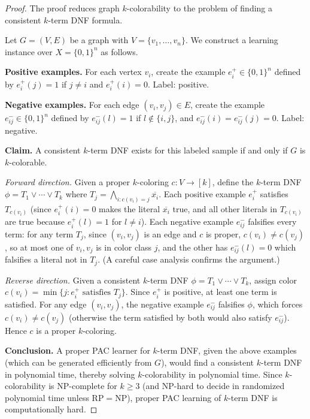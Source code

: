 \begin{proof}[Proof]
The proof reduces graph $k$-colorability to the problem of finding a
consistent $k$-term DNF formula.

Let $G = (V, E)$ be a graph with $V = \{v_1, \ldots, v_n\}$.  We construct
a learning instance over $X = \{0,1\}^n$ as follows.

\medskip\noindent
\textbf{Positive examples.}  For each vertex $v_i$, create the example
$e_i^+ \in \{0,1\}^n$ defined by $e_i^+(j) = 1$ if $j \neq i$ and
$e_i^+(i) = 0$.  Label: positive.

\medskip\noindent
\textbf{Negative examples.}  For each edge $(v_i, v_j) \in E$, create the
example $e_{ij}^- \in \{0,1\}^n$ defined by $e_{ij}^-(l) = 1$ if
$l \notin \{i, j\}$, and $e_{ij}^-(i) = e_{ij}^-(j) = 0$.  Label: negative.

\medskip\noindent
\textbf{Claim.}  A consistent $k$-term DNF exists for this labeled sample
if and only if $G$ is $k$-colorable.

\medskip\noindent
\emph{Forward direction.}  Given a proper $k$-coloring $c \colon V \to [k]$,
define the $k$-term DNF $\phi = T_1 \vee \cdots \vee T_k$ where
$T_j = \bigwedge_{i : c(v_i) = j} \overline{x_i}$.  Each positive example
$e_i^+$ satisfies $T_{c(v_i)}$ (since $e_i^+(i) = 0$ makes the literal
$\overline{x_i}$ true, and all other literals in $T_{c(v_i)}$ are true
because $e_i^+(l) = 1$ for $l \neq i$).  Each negative example $e_{ij}^-$
falsifies every term: for any term $T_j$, since $(v_i, v_j)$ is an edge
and $c$ is proper, $c(v_i) \neq c(v_j)$, so at most one of $v_i, v_j$
is in color class $j$, and the other has $e_{ij}^-(l) = 0$ which falsifies
a literal not in $T_j$.  (A careful case analysis confirms the argument.)

\medskip\noindent
\emph{Reverse direction.}  Given a consistent $k$-term DNF
$\phi = T_1 \vee \cdots \vee T_k$, assign color $c(v_i) = \min\{j : e_i^+
\text{ satisfies } T_j\}$.  Since $e_i^+$ is positive, at least one term is
satisfied.  For any edge $(v_i, v_j)$, the negative example $e_{ij}^-$
falsifies $\phi$, which forces $c(v_i) \neq c(v_j)$ (otherwise the term
satisfied by both would also satisfy $e_{ij}^-$).  Hence $c$ is a proper
$k$-coloring.

\medskip\noindent
\textbf{Conclusion.}  A proper PAC learner for $k$-term DNF, given the
above examples (which can be generated efficiently from $G$), would find
a consistent $k$-term DNF in polynomial time, thereby solving $k$-colorability
in polynomial time.  Since $k$-colorability is NP-complete for $k \geq 3$
(and NP-hard to decide in randomized polynomial time unless
$\mathrm{RP} = \mathrm{NP}$), proper PAC learning of $k$-term DNF is
computationally hard.
\end{proof}


